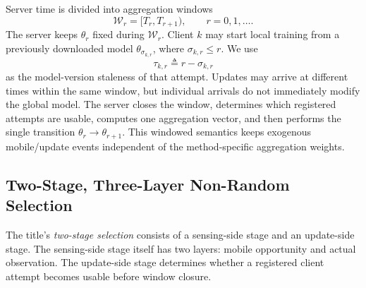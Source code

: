\documentclass[letterpaper,journal]{IEEEtran}
\begin{document}
Server time is divided into aggregation windows
\begin{equation}
    \mathcal{W}_r=[T_r,T_{r+1}), \qquad r=0,1,\ldots .
    \label{eq:window}
\end{equation}
The server keeps $\theta_r$ fixed during $\mathcal{W}_r$.  Client $k$ may start
local training from a previously downloaded model $\theta_{\sigma_{k,r}}$,
where $\sigma_{k,r}\le r$.  We use
\begin{equation}
    \tau_{k,r}\triangleq r-\sigma_{k,r}
    \label{eq:staleness}
\end{equation}
as the model-version staleness of that attempt.  Updates may arrive at different
times within the same window, but individual arrivals do not immediately modify
the global model.  The server closes the window, determines which registered
attempts are usable, computes one aggregation vector, and then performs the
single transition $\theta_r\rightarrow\theta_{r+1}$.  This windowed semantics
keeps exogenous mobile/update events independent of the method-specific
aggregation weights.

\subsection{Two-Stage, Three-Layer Non-Random Selection}
\label{subsec:selection_process}

The title's \emph{two-stage selection} consists of a sensing-side stage and an
update-side stage.  The sensing-side stage itself has two layers: mobile
opportunity and actual observation.  The update-side stage determines whether a
registered client attempt becomes usable before window closure.
\end{document}

